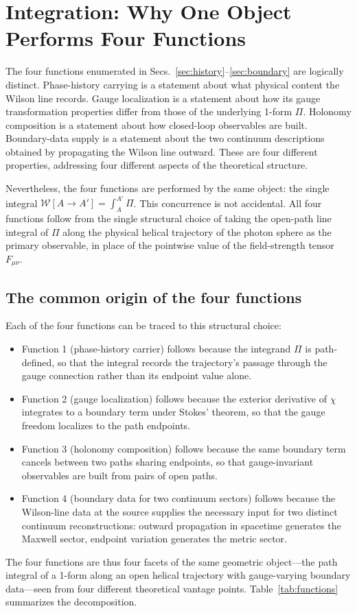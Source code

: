 \documentclass[%
 reprint, amsmath,amssymb, aps, prb, ]{revtex4-2}
\numberwithin{equation}{section}
\newcommand{\WL}{\mathcal{W}}
\begin{document}
\section{Integration: Why One Object Performs Four Functions}
\label{sec:integration}

The four functions enumerated in Secs.~\ref{sec:history}--\ref{sec:boundary} are logically distinct. Phase-history carrying is a statement about what physical content the Wilson line records. Gauge localization is a statement about how its gauge transformation properties differ from those of the underlying 1-form $\Pi$. Holonomy composition is a statement about how closed-loop observables are built. Boundary-data supply is a statement about the two continuum descriptions obtained by propagating the Wilson line outward. These are four different properties, addressing four different aspects of the theoretical structure.

Nevertheless, the four functions are performed by the same object: the single integral $\WL[A\to A'] = \int_A^{A'}\Pi$. This concurrence is not accidental. All four functions follow from the single structural choice of taking the open-path line integral of $\Pi$ along the physical helical trajectory of the photon sphere as the primary observable, in place of the pointwise value of the field-strength tensor $F_{\mu\nu}$.

\subsection{The common origin of the four functions}

Each of the four functions can be traced to this structural choice:
\begin{itemize}
\item Function 1 (phase-history carrier) follows because the integrand $\Pi$ is path-defined, so that the integral records the trajectory's passage through the gauge connection rather than its endpoint value alone.
\item Function 2 (gauge localization) follows because the exterior derivative of $\chi$ integrates to a boundary term under Stokes' theorem, so that the gauge freedom localizes to the path endpoints.
\item Function 3 (holonomy composition) follows because the same boundary term cancels between two paths sharing endpoints, so that gauge-invariant observables are built from pairs of open paths.
\item Function 4 (boundary data for two continuum sectors) follows because the Wilson-line data at the source supplies the necessary input for two distinct continuum reconstructions: outward propagation in spacetime generates the Maxwell sector, endpoint variation generates the metric sector.
\end{itemize}
The four functions are thus four facets of the same geometric object---the path integral of a 1-form along an open helical trajectory with gauge-varying boundary data---seen from four different theoretical vantage points. Table~\ref{tab:functions} summarizes the decomposition.
\end{document}
